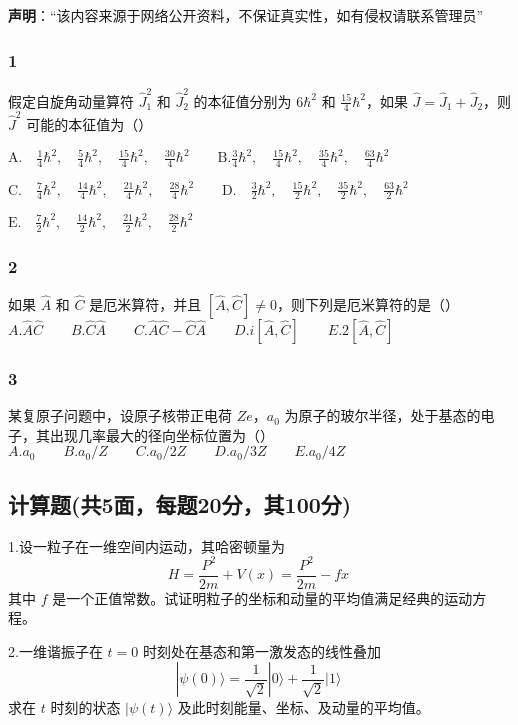 
\textbf{声明}：“该内容来源于网络公开资料，不保证真实性，如有侵权请联系管理员”

\subsubsection{1}
假定自旋角动量算符 $\hat{J}_1^2$ 和 $\hat{J}_2^2$ 的本征值分别为 $6\hbar^2$ 和 $\frac{15}{4}\hbar^2$，如果 $\hat{J} = \hat{J}_1 + \hat{J}_2$，则 $\hat{J}^2$ 可能的本征值为（）

$\text{A.} \quad \frac{1}{4}\hbar^2, \quad \frac{5}{4}\hbar^2, \quad \frac{15}{4}\hbar^2, \quad \frac{30}{4}\hbar^2\qquad \text{B.}\frac{3}{4}\hbar^2, \quad \frac{15}{4}\hbar^2, \quad \frac{35}{4}\hbar^2, \quad \frac{63}{4}\hbar^2$

$\text{C.} \quad \frac{7}{4}\hbar^2, \quad \frac{14}{4}\hbar^2, \quad \frac{21}{4}\hbar^2, \quad \frac{28}{4}\hbar^2\qquad\text{D.} \quad \frac{3}{2}\hbar^2, \quad \frac{15}{2}\hbar^2, \quad \frac{35}{2}\hbar^2, \quad \frac{63}{2}\hbar^2$

$\text{E.} \quad \frac{7}{2}\hbar^2, \quad \frac{14}{2}\hbar^2, \quad \frac{21}{2}\hbar^2, \quad \frac{28}{2}\hbar^2$
\subsubsection{2}
如果 $\hat{A}$ 和 $\hat{C}$ 是厄米算符，并且 $[\hat{A}, \hat{C}] \neq 0$，则下列是厄米算符的是（）\\
$A. \hat{A}\hat{C}\qquad B. \hat{C}\hat{A}\qquad C. \hat{A}\hat{C} - \hat{C}\hat{A}\qquad D. i[\hat{A}, \hat{C}]\qquad E. 2[\hat{A}, \hat{C}]$
\subsubsection{3}
某复原子问题中，设原子核带正电荷 $Ze$，$a_0$ 为原子的玻尔半径，处于基态的电子，其出现几率最大的径向坐标位置为（）\\
$A. a_0\qquad B. a_0/Z \qquad C. a_0/2Z\qquad D. a_0/3Z\qquad E. a_0/4Z$
\subsection{计算题(共5面，每题20分，其100分)}
1.设一粒子在一维空间内运动，其哈密顿量为
$$H = \frac{P^2}{2m} + V(x) = \frac{P^2}{2m} - fx~$$
其中 $f$ 是一个正值常数。试证明粒子的坐标和动量的平均值满足经典的运动方程。

2.一维谐振子在 $t=0$ 时刻处在基态和第一激发态的线性叠加
$$|\psi(0)\rangle = \frac{1}{\sqrt{2}} |0\rangle + \frac{1}{\sqrt{2}} |1\rangle~$$
求在 $t$ 时刻的状态 $|\psi(t)\rangle$ 及此时刻能量、坐标、及动量的平均值。
